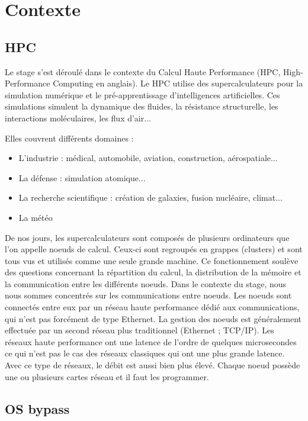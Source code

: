 \section{Contexte}

\subsection{HPC}

Le stage s'est déroulé dans le contexte du Calcul Haute Performance (HPC, High-Performance Computing en anglais).
Le HPC utilise des supercalculateurs pour la simulation numérique et le pré-apprentissage d'intelligences artificielles.
Ces simulations simulent la dynamique des fluides, la résistance structurelle, les interactions moléculaires, les flux d'air...

\bigskip

\noindent{}Elles couvrent différents domaines :
\begin{itemize}
  \item L'industrie : médical, automobile, aviation, construction, aérospatiale...
  \item La défense : simulation atomique...
  \item La recherche scientifique : création de galaxies, fusion nucléaire, climat...
  \item La météo
\end{itemize}

\bigskip

De nos jours, les supercalculateurs sont composés de plusieurs ordinateurs que l'on appelle noeuds de calcul.
Ceux-ci sont regroupés en grappes (clusters) et sont tous vus et utilisés comme une seule grande machine.
Ce fonctionnement soulève des questions concernant la répartition du calcul, la distribution de la mémoire et la communication entre les différents noeuds.
Dans le contexte du stage, nous nous sommes concentrés sur les communications entre noeuds.
Les noeuds sont connectés entre eux par un réseau haute performance dédié aux communications, qui n'est pas forcément de type Ethernet.
La gestion des noeuds est généralement effectuée par un second réseau plus traditionnel (Ethernet ; TCP/IP).
Les réseaux haute performance ont une latence de l'ordre de quelques microsecondes ce qui n'est pas le cas des réseaux classiques qui ont une plus grande latence.
Avec ce type de réseaux, le débit est aussi bien plus élevé.
Chaque noeud possède une ou plusieurs cartes réseau et il faut les programmer.

\subsection{OS bypass}

